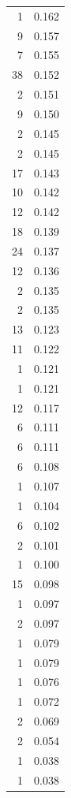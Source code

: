 \begin{tabular}{rr}
1 & 0.162 \\
9 & 0.157 \\
7 & 0.155 \\
38 & 0.152 \\
2 & 0.151 \\
9 & 0.150 \\
2 & 0.145 \\
2 & 0.145 \\
17 & 0.143 \\
10 & 0.142 \\
12 & 0.142 \\
18 & 0.139 \\
24 & 0.137 \\
12 & 0.136 \\
2 & 0.135 \\
2 & 0.135 \\
13 & 0.123 \\
11 & 0.122 \\
1 & 0.121 \\
1 & 0.121 \\
12 & 0.117 \\
6 & 0.111 \\
6 & 0.111 \\
6 & 0.108 \\
1 & 0.107 \\
1 & 0.104 \\
6 & 0.102 \\
2 & 0.101 \\
1 & 0.100 \\
15 & 0.098 \\
1 & 0.097 \\
2 & 0.097 \\
1 & 0.079 \\
1 & 0.079 \\
1 & 0.076 \\
1 & 0.072 \\
2 & 0.069 \\
2 & 0.054 \\
1 & 0.038 \\
1 & 0.038 \\
\bottomrule
\end{tabular}
